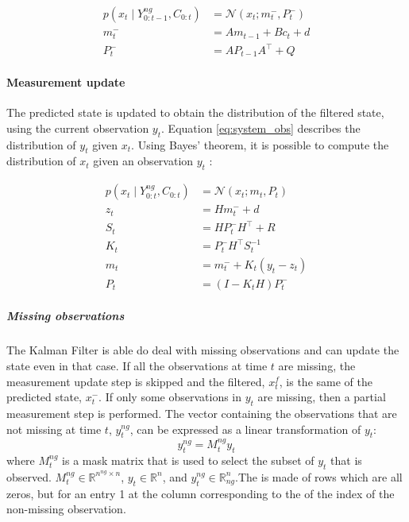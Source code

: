\documentclass{article}
\newcommand{\norm}[3]{\mathcal{N}\left(#1; #2, #3\right)} %
\begin{document}
\begin{equation}
\begin{aligned}\label{eq:time_update}
    p(x_t \mid Y^{ng}_{0:t-1}, C_{0:t}) &= \norm{x_t}{m_t^-}{ P_t^-}\\
    m_t^- &= Am_{t-1} + B c_t + d \\
    P_t^- &= AP_{t-1}A^\top + Q
\end{aligned}
\end{equation}

\paragraph{Measurement update}

The predicted state is updated to obtain the distribution of the filtered state, using the current observation $y_t$. Equation \ref{eq:system_obs} describes the distribution of $y_t$ given $x_t$. Using Bayes' theorem, it is possible to compute the distribution of $x_t$ given an observation $y_t$ \cite{bishop_pattern_2006, 2020_hennig_pml}:

\begin{equation}
\begin{aligned}
     p(x_t \mid Y^{ng}_{0:t}, C_{0:t}) &= \mathcal{N}(x_t; m_t, P_t) \label{eq:meas_update}\\
     z_t &= Hm_t^- + d \\
     S_t &= HP_t^-H^\top + R \\
     K_t &= P_t^-H^\top S_t^{-1} \\
     m_t &= m_t^- + K_t(y_t - z_t) \\
     P_t &= (I-K_tH)P_t^- 
\end{aligned}
\end{equation}
    
\subparagraph{Missing observations}

The Kalman Filter is able do deal with missing observations and can update the state even in that case. 
If all the observations at time $t$ are missing, the measurement update step is skipped and the filtered, $x^f_t$, is the same of the predicted state, $x_t^-$. If only some observations in $y_t$ are missing, then a partial measurement step is performed.
The vector containing the observations that are not missing at time $t$, $y^{ng}_t$, can be expressed as a linear transformation of $y_t$:
\begin{equation}\label{eq:miss_obs}
    y^{ng}_t = M^{ng}_ty_t
\end{equation}
where $M^{ng}_t$ is a mask matrix that is used to select the subset of $y_t$ that is observed. $M_t^{ng} \in \mathbb{R}^{n^{ng} \times n}$, $y_t \in \mathbb{R}^n$, and $y_t^{ng} \in \mathbb{R}^n_{ng}$.The is made of rows which are all zeros, but for an entry 1 at the column corresponding to the of the index of the non-missing observation.
\end{document}
